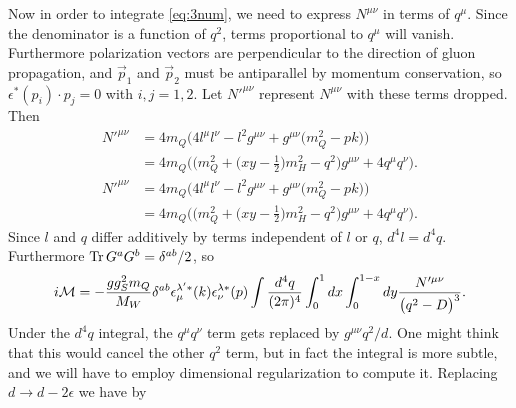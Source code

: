 Now in order to integrate \eqref{eq:3num}, we need to express $N^{\mu\nu}$
in terms of $q^\mu$. Since the denominator is a function of $q^2$, terms
proportional to $q^\mu$ will vanish. Furthermore polarization vectors are
perpendicular to the direction of gluon propagation, and $\vec{p}_1$ and
$\vec{p}_2$ must be antiparallel by momentum conservation, so
$\epsilon^*(p_i)\cdot p_j=0$ with $i,j=1,2$. Let $N'^{\mu\nu}$ represent
$N^{\mu\nu}$ with these terms dropped. Then
\begin{equation}
  \begin{aligned}
    N'^{\mu\nu}&=4m_Q\Big(4l^\mu l^\nu-l^2g^{\mu\nu}
                    +g^{\mu\nu}\big(m_Q^2-pk\big)\Big) \\
               &=4m_Q\Bigg(\Big(m_Q^2
                    +\Big(xy-\tfrac{1}{2}\Big)m_H^2-q^2\Big)g^{\mu\nu}
                    +4q^\mu q^\nu\Bigg).
  \end{aligned}
\end{equation}
\begin{equation}
  \begin{aligned}
    N'^{\mu\nu}&=4m_Q\Big(4l^\mu l^\nu-l^2g^{\mu\nu}
                    +g^{\mu\nu}\big(m_Q^2-pk\big)\Big) \\
               &=4m_Q\Bigg(\Big(m_Q^2
                    +\Big(xy-\tfrac{1}{2}\Big)m_H^2-q^2\Big)g^{\mu\nu}
                    +4q^\mu q^\nu\Bigg).
  \end{aligned}
\end{equation}
Since $l$ and $q$ differ additively by terms independent of $l$ or $q$,
$d^4l=d^4q$. Furthermore $\Tr G^aG^b=\delta^{ab}/2$, so
\begin{equation}
  \label{eq:53}
  i\mathcal{M}=-\frac{gg_S^2m_Q}{M_W}\delta^{ab}\epsilon^{\lambda'*}_\mu(k)
           \epsilon^{\lambda*}_\nu(p)\int\frac{d^4q}{(2\pi)^4}
           \int_0^1dx\int_0^{1-x}dy\frac{N'^{\mu\nu}}{\big(q^2-D\big)^3}.
\end{equation}
Under the $d^4q$ integral, the $q^\mu q^\nu$ term gets replaced by
$g^{\mu\nu}q^2/d$. One might think that this would cancel the other $q^2$
term, but in fact the integral is more subtle, and we will have to
employ dimensional regularization to compute it. Replacing
$d\to d-2\epsilon$ we have by \cite[A.45]{peskin_introduction_1995}
